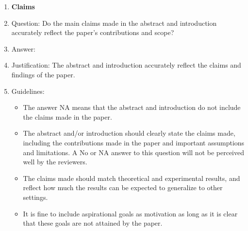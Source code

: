 \documentclass[letterpaper]{article}
\begin{document}
\begin{enumerate}

\item {\bf Claims}
    \item[] Question: Do the main claims made in the abstract and introduction accurately reflect the paper's contributions and scope?
    \item[] Answer: \answerYes{} %
    \item[] Justification:  The abstract and introduction accurately reflect the claims and findings of the paper.
    \item[] Guidelines:
    \begin{itemize}
        \item The answer NA means that the abstract and introduction do not include the claims made in the paper.
        \item The abstract and/or introduction should clearly state the claims made, including the contributions made in the paper and important assumptions and limitations. A No or NA answer to this question will not be perceived well by the reviewers. 
        \item The claims made should match theoretical and experimental results, and reflect how much the results can be expected to generalize to other settings. 
        \item It is fine to include aspirational goals as motivation as long as it is clear that these goals are not attained by the paper. 
    \end{itemize}


\end{enumerate}
\end{document}
